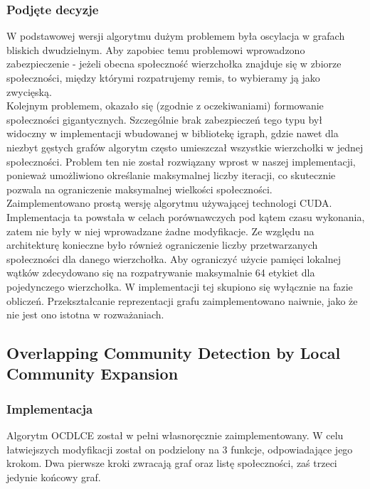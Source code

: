 \documentclass{article}
\begin{document}
\subsubsection{Podjęte decyzje}

W podstawowej wersji algorytmu dużym problemem była oscylacja w grafach bliskich dwudzielnym. Aby zapobiec temu problemowi wprowadzono zabezpieczenie - jeżeli obecna społeczność wierzchołka znajduje się w zbiorze społeczności, między którymi rozpatrujemy remis, to wybieramy ją jako zwycięską.\\

Kolejnym problemem, okazało się (zgodnie z oczekiwaniami) formowanie społeczności gigantycznych. Szczególnie brak zabezpieczeń tego typu był widoczny w implementacji wbudowanej w bibliotekę igraph, gdzie nawet dla niezbyt gęstych grafów algorytm często umieszczał wszystkie wierzchołki w jednej społeczności. Problem ten nie został rozwiązany wprost w naszej implementacji, ponieważ umożliwiono określanie maksymalnej liczby iteracji, co skutecznie pozwala na ograniczenie maksymalnej wielkości społeczności.\\

Zaimplementowano prostą wersję algorytmu używającej technologi CUDA. Implementacja ta powstała w celach porównawczych pod kątem czasu wykonania, zatem nie były w niej wprowadzane żadne modyfikacje. Ze względu na architekturę konieczne było również ograniczenie liczby przetwarzanych społeczności dla danego wierzchołka. Aby ograniczyć użycie pamięci lokalnej wątków zdecydowano się na rozpatrywanie maksymalnie 64 etykiet dla pojedynczego wierzchołka. W implementacji tej skupiono się wyłącznie na fazie obliczeń. Przekształcanie reprezentacji grafu zaimplementowano naiwnie, jako że nie jest ono istotna w rozważaniach.

\subsection{Overlapping Community Detection by Local Community Expansion}
\subsubsection{Implementacja}

Algorytm OCDLCE został w pełni własnoręcznie zaimplementowany. W celu łatwiejszych modyfikacji został on podzielony na 3 funkcje, odpowiadające jego krokom. Dwa pierwsze kroki zwracają graf oraz listę społeczności, zaś trzeci jedynie końcowy graf. \\
\end{document}

